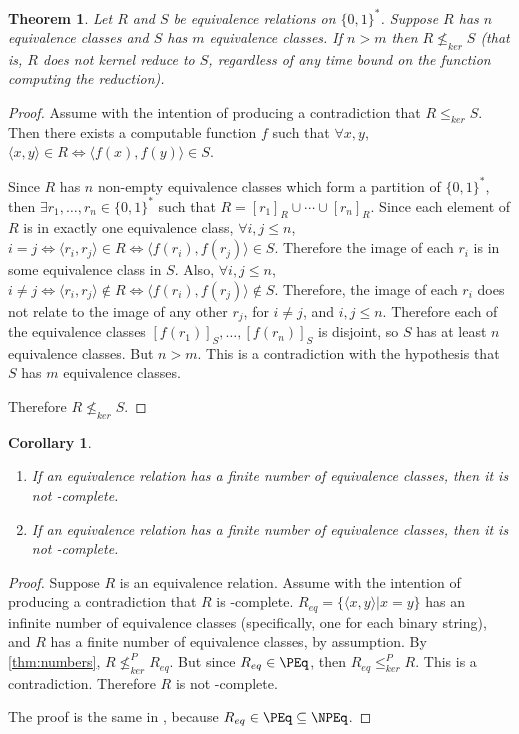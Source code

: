 \documentclass{article}
\newtheorem{theorem}{Theorem}[section]
\newtheorem{corollary}[corollary]{Corollary}
\theoremstyle{definition} \newtheorem{definition}[definition]{Definition}
\newcommand{\sigmastar}{\{0, 1\}^{*}} %
\newcommand{\kr}{\leq^{P}_{ker}} %
\newcommand{\nkr}{\nleq^{P}_{ker}} %
\newcommand{\krnt}{\leq_{ker}} %
\newcommand{\nkrnt}{\nleq_{ker}} %
\newcommand{\pair}[2]{\langle#1,#2\rangle} %
\begin{document}
\begin{theorem}\label{thm:numbers}
  Let $R$ and $S$ be equivalence relations on $\sigmastar$.
  Suppose $R$ has $n$ equivalence classes and $S$ has $m$ equivalence classes.
  If $n>m$ then $R\nkrnt S$ (that is, $R$ does not kernel reduce to $S$, regardless of any time bound on the function computing the reduction).
\end{theorem}
\begin{proof}
  Assume with the intention of producing a contradiction that $R\krnt S$.
  Then there exists a computable function $f$ such that $\forall x,y$, $\pair{x}{y}\in R\iff \pair{f(x)}{f(y)}\in S$.

  Since $R$ has $n$ non-empty equivalence classes which form a partition of $\sigmastar$, then $\exists r_1,\ldots,r_n\in\sigmastar$ such that $R=[r_1]_R\cup\cdots\cup[r_n]_R$.
  Since each element of $R$ is in exactly one equivalence class, $\forall i,j\leq n$, $i=j\iff\pair{r_i}{r_j}\in R\iff\pair{f(r_i)}{f(r_j)}\in S$.
  Therefore the image of each $r_i$ is in some equivalence class in $S$.
  Also, $\forall i,j\leq n$, $i\neq j\iff \pair{r_i}{r_j}\notin R\iff \pair{f(r_i)}{f(r_j)}\notin S$.
  Therefore, the image of each $r_i$ does not relate to the image of any other $r_j$, for $i\neq j$, and $i,j\leq n$.
  Therefore each of the equivalence classes $[f(r_1)]_S,\ldots,[f(r_n)]_S$ is disjoint, so $S$ has at least $n$ equivalence classes.
  But $n>m$.
  This is a contradiction with the hypothesis that $S$ has $m$ equivalence classes.

  Therefore $R\nkrnt S$.
\end{proof}

\begin{corollary}\label{cor:finite}
  \mbox{}
  \begin{enumerate}
    \renewcommand{\labelenumi}{\roman{enumi}.}
  \item If an equivalence relation has a finite number of equivalence classes, then it is not \PEq-complete.
  \item If an equivalence relation has a finite number of equivalence classes, then it is not \NPEq-complete.
  \end{enumerate}
\end{corollary}
\begin{proof}
  Suppose $R$ is an equivalence relation.
  Assume with the intention of producing a contradiction that $R$ is \PEq-complete.
  $R_{eq}=\{\pair{x}{y}|x=y\}$ has an infinite number of equivalence classes (specifically, one for each binary string), and $R$ has a finite number of equivalence classes, by assumption.
  By \autoref{thm:numbers}, $R\nkr R_{eq}$.
  But since $R_{eq}\in\PEq$, then $R_{eq}\kr R$.
  This is a contradiction.
  Therefore $R$ is not \PEq-complete.

  The proof is the same in \NPEq, because $R_{eq}\in\PEq\subseteq\NPEq$.
\end{proof}
\end{document}
